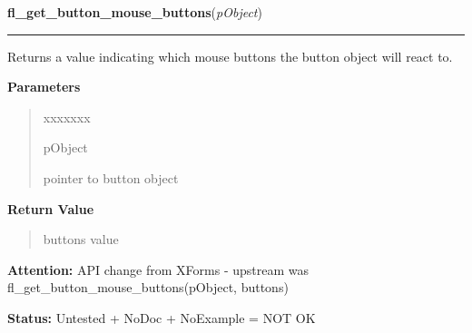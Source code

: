 \hspace{.8\funcindent}\begin{boxedminipage}{\funcwidth}

    \raggedright \textbf{fl\_get\_button\_mouse\_buttons}(\textit{pObject})

    \vspace{-1.5ex}

    \rule{\textwidth}{0.5\fboxrule}
\setlength{\parskip}{2ex}
    Returns a value indicating which mouse buttons the button object will 
    react to.

\setlength{\parskip}{1ex}
      \textbf{Parameters}
      \vspace{-1ex}

      \begin{quote}
        \begin{Ventry}{xxxxxxx}

          \item[pObject]

          pointer to button object

        \end{Ventry}

      \end{quote}

      \textbf{Return Value}
    \vspace{-1ex}

      \begin{quote}
      buttons value

      \end{quote}

\textbf{Attention:} API change from XForms - upstream was 
fl\_get\_button\_mouse\_buttons(pObject, buttons)



\textbf{Status:} Untested + NoDoc + NoExample = NOT OK



    \end{boxedminipage}

    \label{xformslib:library:fl_create_generic_canvas}

    \vspace{0.5ex}

